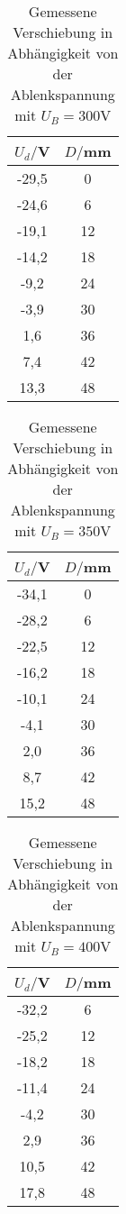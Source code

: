\begin{table}[H]
  \centering
  \caption{Gemessene Verschiebung in Abhängigkeit von der Ablenkspannung mit $U_B=300$V}
  \label{tab:Spannungsamplitude}
  \begin{tabular}{c c}
    \toprule
    $U_d/$V & $D/$mm \\
    \midrule
     -29,5 & 0 \\
     -24,6 & 6 \\
     -19,1 & 12 \\
     -14,2 & 18 \\
      -9,2 & 24 \\
      -3,9 & 30 \\
       1,6 & 36 \\
       7,4 & 42 \\
      13,3 & 48 \\
    \bottomrule
  \end{tabular}
\end{table}


\begin{table}[H]
  \centering
  \caption{Gemessene Verschiebung in Abhängigkeit von der Ablenkspannung mit $U_B=350$V}
  \label{tab:Spannungsamplitude}
  \begin{tabular}{c c}
    \toprule
    $U_d/$V & $D/$mm \\
    \midrule
     -34,1 & 0 \\
     -28,2 & 6 \\
     -22,5 & 12 \\
     -16,2 & 18 \\
     -10,1 & 24 \\
      -4,1 & 30 \\
       2,0 & 36 \\
       8,7 & 42 \\
      15,2 & 48 \\
    \bottomrule
  \end{tabular}
\end{table}


\begin{table}[H]
  \centering
  \caption{Gemessene Verschiebung in Abhängigkeit von der Ablenkspannung mit $U_B=400$V}
  \label{tab:Spannungsamplitude}
  \begin{tabular}{c c}
    \toprule
    $U_d/$V & $D/$mm \\
    \midrule
     -32,2 & 6 \\
     -25,2 & 12 \\
     -18,2 & 18 \\
     -11,4 & 24 \\
      -4,2 & 30 \\
       2,9 & 36 \\
      10,5 & 42 \\
      17,8 & 48 \\
    \bottomrule
  \end{tabular}
\end{table}


